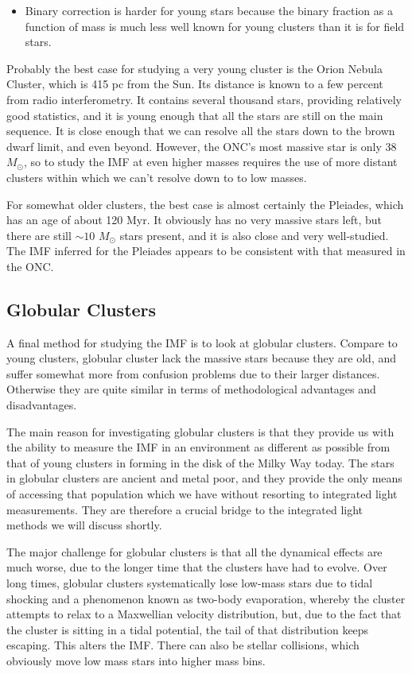 \begin{itemize}
\item Binary correction is harder for young stars because the binary fraction as a function of mass is much less well known for young clusters than it is for field stars.
\end{itemize}

Probably the best case for studying a very young cluster is the Orion Nebula Cluster, which is 415 pc from the Sun. Its distance is known to a few percent from radio interferometry. It contains several thousand stars, providing relatively good statistics, and it is young enough that all the stars are still on the main sequence. It is close enough that we can resolve all the stars down to the brown dwarf limit, and even beyond. However, the ONC's most massive star is only 38 $M_\odot$, so to study the IMF at even higher masses requires the use of more distant clusters within which we can't resolve down to to low masses. 

For somewhat older clusters, the best case is almost certainly the Pleiades, which has an age of about 120 Myr. It obviously has no very massive stars left, but there are still $\sim 10$ $M_\odot$ stars present, and it is also close and very well-studied. The IMF inferred for the Pleiades appears to be consistent with that measured in the ONC.

\subsection{Globular Clusters}

A final method for studying the IMF is to look at globular clusters. Compare to young clusters, globular cluster lack the massive stars because they are old, and suffer somewhat more from confusion problems due to their larger distances. Otherwise they are quite similar in terms of methodological advantages and disadvantages.

The main reason for investigating globular clusters is that they provide us with the ability to measure the IMF in an environment as different as possible from that of young clusters in forming in the disk of the Milky Way today. The stars in globular clusters are ancient and metal poor, and they provide the only means of accessing that population which we have without resorting to integrated light measurements. They are therefore a crucial bridge to the integrated light methods we will discuss shortly.

The major challenge for globular clusters is that all the dynamical effects are much worse, due to the longer time that the clusters have had to evolve. Over long times, globular clusters systematically lose low-mass stars due to tidal shocking and a phenomenon known as two-body evaporation, whereby the cluster attempts to relax to a Maxwellian velocity distribution, but, due to the fact that the cluster is sitting in a tidal potential, the tail of that distribution keeps escaping. This alters the IMF. There can also be stellar collisions, which obviously move low mass stars into higher mass bins.

